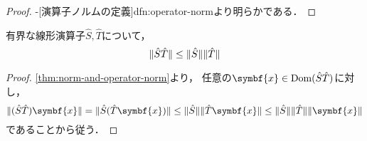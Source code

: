 \documentclass[../sotsu.tex]{subfiles}
\begin{document}
\begin{proof}
    -[演算子ノルムの定義]{dfn:operator-norm}より明らかである．
\end{proof}



\begin{proposition}
    有界な線形演算子$\hat{S}, \hat{T}$について，
    \begin{equation*}
        \lVert\hat{S} \hat{T}\rVert \leq \lVert\hat{S}\rVert \lVert\hat{T}\rVert
    \end{equation*}
\end{proposition}

\begin{proof}
    \cref{thm:norm-and-operator-norm}より，
    任意の$\symbf{x} \in \domain(\hat{S} \hat{T})$に対し，
    \begin{equation*}
        \norm{(\hat{S} \hat{T}) \symbf{x}}
        = \norm{\hat{S} (\hat{T} \symbf{x})}
        \leq \opnorm{\hat{S}} \norm{\hat{T} \symbf{x}}
        \leq \opnorm{\hat{S}} \opnorm{\hat{T}} \norm{\symbf{x}}
    \end{equation*}
    であることから従う．
\end{proof}
\end{document}
